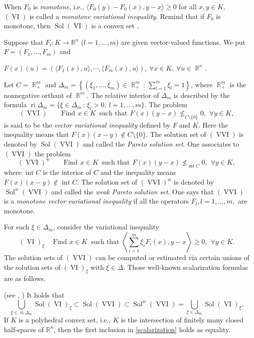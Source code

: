 \documentclass[smallextended,envcountsect]{svjour3}       %
\DeclareMathOperator{\Sol}{Sol}
\DeclareMathOperator{\VI}{VI}
\DeclareMathOperator{\ri}{ri}
\DeclareMathOperator{\R}{\mathbb{R}}
\DeclareMathOperator{\VVI}{VVI}
\DeclareMathOperator{\inte}{int}
\begin{document}
When $F_0$ is \textit{monotone}, i.e., $\langle  F_0(y)-F_0(x),y-x\rangle \geq 0$ for all $x,y\in K$, $(\VI)$ is called a \textit{monotone variational inequality}. Remind that if $F_0$  is monotone, then $\Sol(\VI)$ is a convex set \cite{FaPa03}.

Suppose that $F_l: K\to\mathbb R^n$ ($l=1,\dots, m$) are given vector-valued functions. We put $F=(F_1,\dots, F_m)$ and 
\begin{center}
	$F(x)(u)=( \langle F_1(x),u\rangle, \cdots, \langle F_m(x),u\rangle), \ \forall x\in K,\ \forall u\in\R^n$.
\end{center}
Let $C=\R^m_+$ and $\Delta_m=\left\{(\xi_1,\dots,\xi_m)\in \R^m_+\,:\,
\displaystyle\sum_{l=1}^m\xi_l=1\right\}$, where $\R^m_+$ is the nonnegative orthant of  $\R^m$. The relative interior of $\Delta_m$ is described by the formula ${\ri}\Delta_m=\{\xi\in\Delta_m\,:\, \xi_l>0,\ l=1,...,m\}.$ 
The problem
$${ (\VVI)} \qquad {\text{Find}}\ \, x\in K \ \; \text{such that}\ \, F(x)(y-x)\nleq_{C\setminus\{0\}}0,\ \, \forall y\in K,$$ 
is said to be the \textit{vector variational inequality} defined by $F$ and $K$. Here the inequality means that
$F(x)(x-y)\notin C\setminus\{0\}$. 
The solution set of $(\VVI)$ is denoted by $\Sol(\VVI)$ and called the \textit{Pareto solution set}. One associates to $(\VVI)$ the problem
$${(\VVI)^w} \qquad {\text{Find}}\ \, x\in K \ \; \text{such that}\ \, F(x)(y-x)\nleq_{\inte C}0, \ \, \forall y\in K,$$
where ${\inte}C$ is the interior of $C$ and the inequality means $F(x)(x-y)\notin {\inte}C$. The solution set of $(\VVI)^w$ is denoted by $\Sol^w(\VVI)$ and called the \textit{weak Pareto solution set}. One says that $(\VVI)$ is a \textit{monotone vector variational inequality} if all the operators $F_l, l = 1, ..., m,$ are monotone.

For each $\xi\in\Delta_m$, consider the variational inequality 
$$(\VI)_{\xi} \quad\  \text{Find }  x\in K \ \text{ such that }  \left\langle  \sum_{i=1}^m\xi_iF_i(x),y-x\right\rangle  \geq 0, \ \, \forall y\in
K.$$
The solution sets of  $(\VVI)$ can be computed or estimated via certain unions of the solution sets of $(\VI)_{\xi}$ with $\xi\in \Delta$. Those well-known scalarization formulas are as follows.

\begin{theorem} {\rm (see \cite{LKLY98}, \cite{LY01})}\label{thm_scalarization} It holds that
	\begin{equation}\label{scalarization}\bigcup_{\xi\in{\ri}\Delta_m}{\Sol(\VI)}_\xi\subset {\Sol(\VVI)}\subset {\Sol^w}{(\VVI)}=\bigcup_{\xi\in\Delta_m}{\Sol(\VI)}_\xi. \end{equation} 
	If $K$ is a polyhedral convex set, i.e.,
	$K$ is the intersection of finitely many closed half-spaces of
	$\mathbb R^n$, then the first inclusion in \eqref{scalarization}
	holds as equality.
\end{theorem}
\end{document}
